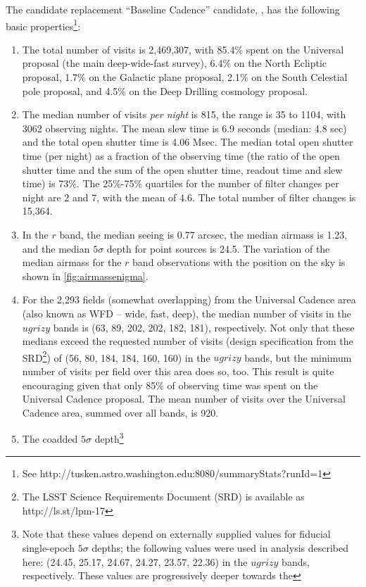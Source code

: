 The candidate replacement ``Baseline Cadence'' candidate,
, has the following basic
properties\footnote{See
http://tusken.astro.washington.edu:8080/summaryStats?runId=1}:
\begin{enumerate}
\item The total number of visits is 2,469,307, with 85.4\% spent on
the Universal proposal (the main deep-wide-fast survey), 6.4\% on the
North Ecliptic proposal, 1.7\% on the Galactic plane proposal, 2.1\%
on the South Celestial pole proposal, and 4.5\% on the Deep Drilling
cosmology proposal.
\item The median number of visits {\it per night} is 815, the range is
35 to 1104, with 3062 observing nights. The mean slew time is 6.9
seconds (median: 4.8 sec) and the total open shutter time is 4.06
Msec. The median total open shutter time (per night) as a fraction of
the observing time (the ratio of the open shutter time and the sum of
the open shutter time, readout time and slew time) is 73\%. The
25\%-75\% quartiles for the number of filter changes per night are 2
and 7, with the mean of 4.6. The total number of filter changes is
15,364.
\item In the $r$ band, the median seeing is 0.77 arcsec, the median
airmass is 1.23, and the median $5\sigma$ depth for point sources is
24.5. The variation of the median airmass for the $r$ band
observations with the position on the sky is shown in
\autoref{fig:airmassenigma}.
\item For the 2,293 fields (somewhat overlapping) from the Universal
Cadence area (also known as WFD -- wide, fast, deep), the median
number of visits in the $ugrizy$ bands is (63, 89, 202, 202, 182,
181), respectively. Not only that these medians exceed the requested
number of visits (design specification from the SRD\footnote{The LSST
Science Requirements Document (SRD) is available as
http://ls.st/lpm-17}) of (56, 80, 184, 184, 160, 160) in the $ugrizy$
bands, but the minimum number of visits per field over this area does
so, too. This result is quite encouraging given that only 85\% of
observing time was spent on the Universal Cadence proposal. The mean
number of visits over the Universal Cadence area, summed over all
bands, is 920.
\item The coadded $5\sigma$ depth\footnote{Note that these values
depend on externally supplied values for fiducial single-epoch
$5\sigma$ depths; the following values were used in analysis described
here: (24.45, 25.17, 24.67, 24.27, 23.57, 22.36) in the $ugrizy$
bands, respectively. These values are progressively deeper towards the
}
\end{enumerate}
